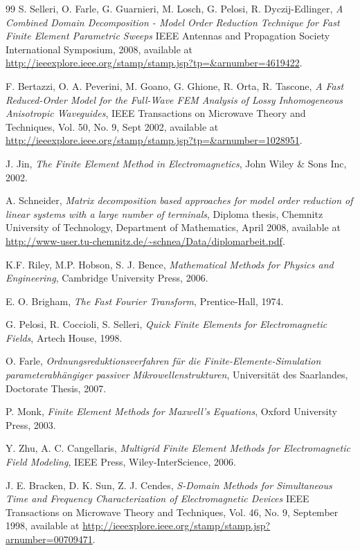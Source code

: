 \begin{thebibliography}{99}
 S. Selleri, O. Farle, G. Guarnieri, M. Losch, G. Pelosi,  R. Dyczij-Edlinger, \emph{A Combined Domain Decomposition - Model Order Reduction Technique for Fast Finite Element Parametric Sweeps} IEEE Antennas and Propagation Society International Symposium, 2008, available at \url{http://ieeexplore.ieee.org/stamp/stamp.jsp?tp=&arnumber=4619422}.

 F. Bertazzi, O. A. Peverini, M. Goano, G. Ghione, R. Orta, R. Tascone, \emph{A Fast Reduced-Order Model for the Full-Wave FEM Analysis of Lossy Inhomogeneous Anisotropic Waveguides}, IEEE Transactions on Microwave Theory and Techniques, Vol. 50, No. 9, Sept 2002, available at \url{http://ieeexplore.ieee.org/stamp/stamp.jsp?tp=&arnumber=1028951}.

 J. Jin, \emph{The Finite Element Method in Electromagnetics}, John Wiley \& Sons Inc, 2002.

 A. Schneider, \emph{Matrix decomposition based approaches for model order reduction of linear systems with a large number of terminals}, Diploma thesis, Chemnitz University of Technology, Department of Mathematics, April 2008, available at \url{http://www-user.tu-chemnitz.de/~schnea/Data/diplomarbeit.pdf}.

 K.F. Riley, M.P. Hobson, S. J. Bence, \emph{Mathematical Methods for Physics and Engineering}, Cambridge University Press, 2006.

 E. O. Brigham, \emph{The Fast Fourier Transform}, Prentice-Hall, 1974.

 G. Pelosi, R. Coccioli, S. Selleri, \emph{Quick Finite Elements for Electromagnetic Fields}, Artech House, 1998.

 O. Farle, \emph{Ordnungsreduktionsverfahren f\"{u}r die Finite-Elemente-Simulation parameterabh\"{a}ngiger passiver Mikrowellenstrukturen}, Universit\"{a}t des Saarlandes, Doctorate Thesis, 2007.

 P. Monk, \emph{Finite Element Methods for Maxwell's Equations}, Oxford University Press, 2003.

 Y. Zhu, A. C. Cangellaris, \emph{Multigrid Finite Element Methods for Electromagnetic Field Modeling}, IEEE Press, Wiley-InterScience, 2006.

 J. E. Bracken, D. K. Sun, Z. J. Cendes, \emph{S-Domain Methods for Simultaneous Time and Frequency Characterization of Electromagnetic Devices} IEEE Transactions on Microwave Theory and Techniques, Vol. 46, No. 9, September 1998, available at \url{http://ieeexplore.ieee.org/stamp/stamp.jsp?arnumber=00709471}.


\end{thebibliography}
